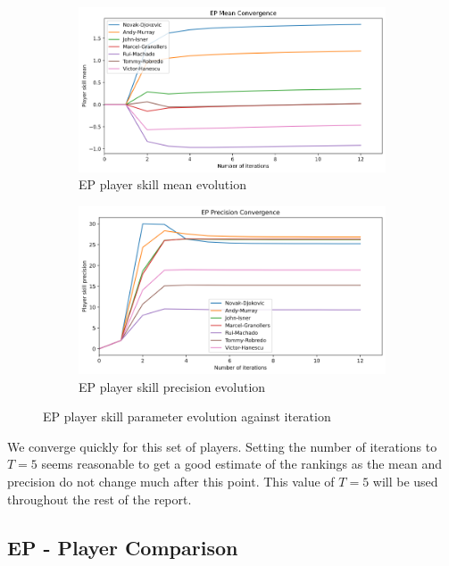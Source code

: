 \documentclass[]{article}
\begin{document}
\begin{figure}[!h]
	\begin{subfigure}{0.5\linewidth}
		\centering
		\includegraphics[width=\linewidth]{ep-mean.png}
		\caption{EP player skill mean evolution}
		\label{fig:ep-mean}
	\end{subfigure}
	\begin{subfigure}{0.5\linewidth}
		\centering
		\includegraphics[width=\linewidth]{ep-precision.png}
		\caption{EP player skill precision evolution}
		\label{fig:ep-precision}
	\end{subfigure}
	\caption{EP player skill parameter evolution against iteration}
	\label{fig:ep-evolution}
\end{figure}

We converge quickly for this set of players. Setting the number of iterations to $T=5$ seems reasonable to get a good estimate of the rankings as the mean and precision do not change much after this point. This value of $T=5$ will be used throughout the rest of the report.

\subsection{EP - Player Comparison}
\end{document}
